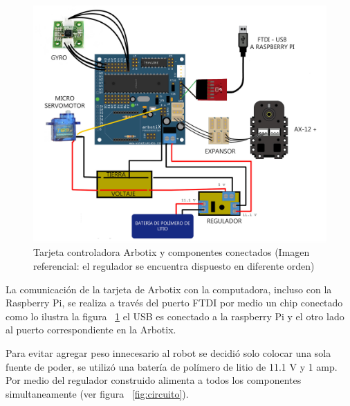 \begin{figure}[hbtp]
\centering
\includegraphics[scale=0.2]{imagenes/arbotix_componentes1.jpg}
\caption{Tarjeta controladora Arbotix y componentes conectados (Imagen referencial: el regulador se encuentra dispuesto en diferente orden)}
\label{fig:arbotixConectados}
\end{figure}

La comunicación de la tarjeta de Arbotix con la computadora, incluso con la Raspberry Pi, se realiza a través del puerto FTDI por medio un chip conectado como lo ilustra la figura ~\ref{fig:arbotixConectados} el USB es conectado a la raspberry Pi y el otro lado al puerto correspondiente en la Arbotix.

Para evitar agregar peso innecesario al robot se decidi\'o solo colocar una sola fuente de poder, se utilizó una batería de polímero de litio de 11.1 V y 1 amp. Por medio del regulador construido alimenta a todos los componentes simultaneamente (ver figura ~\ref{fig:circuito}).



